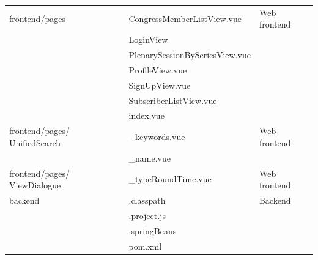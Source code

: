 \documentclass[conference]{IEEEtran}
\begin{document}
\begin{table}[htbp]
\begin{center}
\begin{tabular}{|p{2.5cm}|p{4cm}|p{1.2cm}|}
frontend/pages& CongressMemberListView.vue & Web frontend\\
& LoginView & \\
& PlenarySessionBySeriesView.vue & \\
& ProfileView.vue & \\
& SignUpView.vue & \\
& SubscriberListView.vue & \\
& index.vue & \\
\hline
frontend/pages/  UnifiedSearch & \_keywords.vue & Web frontend \\
& \_name.vue  & \\
\hline
frontend/pages/  ViewDialogue & \_typeRoundTime.vue & Web frontend \\
\hline
backend& .classpath & Backend \\
& .project.js & \\
& .springBeans & \\
& pom.xml & \\

\hline
\end{tabular}
\label{tab1}
\end{center}
\end{table}
\end{document}
